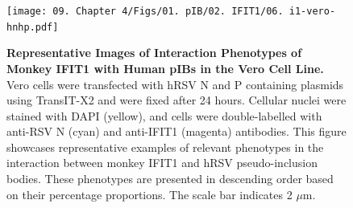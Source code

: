 \begin{figure}
    \centering
    \texttt{[image: 09. Chapter 4/Figs/01. pIB/02. IFIT1/06. i1-vero-hnhp.pdf]}
    \caption[Representative Images of Interaction Phenotypes of Monkey IFIT1 with Human pIBs in the Vero Cell Line.]{\textbf{Representative Images of Interaction Phenotypes of Monkey IFIT1 with Human pIBs in the Vero Cell Line.} Vero cells were transfected with hRSV N and P containing plasmids using TransIT-X2 and were fixed after 24 hours. Cellular nuclei were stained with DAPI (yellow), and cells were double-labelled with anti-RSV N (cyan) and anti-IFIT1 (magenta) antibodies. This figure showcases representative examples of relevant phenotypes in the interaction between monkey IFIT1 and hRSV pseudo-inclusion bodies. These phenotypes are presented in descending order based on their percentage proportions. The scale bar indicates 2 \(\mu \mbox{m}\).}
    \label{fig:Representative Images of Interaction Phenotypes of Monkey IFIT1 with Human pIBs in the VERO Cell Line}
\end{figure}

